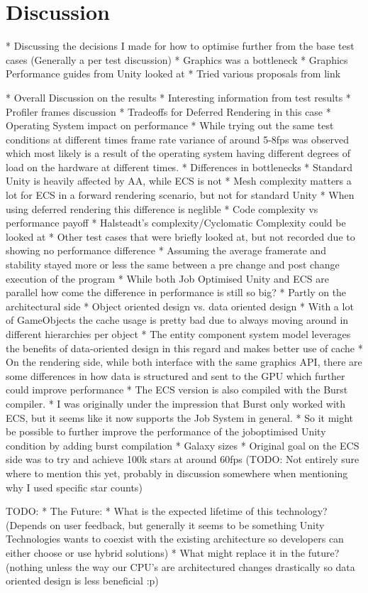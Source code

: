 \section{Discussion}
   * Discussing the decisions I made for how to optimise further from the base test cases (Generally a per test discussion)
      * Graphics was a bottleneck
            * Graphics Performance guides from Unity looked at
                  * Tried various proposals from link

   * Overall Discussion on the results
   * Interesting information from test results 
      * Profiler frames discussion 
      * Tradeoffs for Deferred Rendering in this case
      * Operating System impact on performance
         * While trying out the same test conditions at different times frame rate variance of around 5-8fps was observed which most likely is a result of the operating system having different degrees of load on the hardware at different times.
      * Differences in bottlenecks
         * Standard Unity is heavily affected by AA, while ECS is not
         * Mesh complexity matters a lot for ECS in a forward rendering scenario, but not for standard Unity
            * When using deferred rendering this difference is neglible
   * Code complexity vs performance payoff
       * Halsteadt's complexity/Cyclomatic Complexity could be looked at
   * Other test cases that were briefly looked at, but not recorded due to showing no performance difference
      * Assuming the average framerate and stability stayed more or less the same between a pre change and post change execution of the program
   * While both Job Optimised Unity and ECS are parallel how come the difference in performance is still so big?
      * Partly on the architectural side
         * Object oriented design vs. data oriented design
         * With a lot of GameObjects the cache usage is pretty bad due to always moving around in different hierarchies per object
         * The entity component system model leverages the benefits of data-oriented design in this regard and makes better use of cache
         * On the rendering side, while both interface with the same graphics  API, there are some differences in how data is structured and sent to the GPU which further could improve performance
      * The ECS version is also compiled with the Burst compiler.
         * I was originally under the impression that Burst only worked with ECS, but it seems like it now supports the Job System in general. 
         * So it might be possible to further improve the performance of the joboptimised Unity condition by adding burst compilation
   * Galaxy sizes
      * Original goal on the ECS side was to try and achieve 100k stars at around 60fps (TODO: Not entirely sure where to mention this yet, probably in discussion somewhere when mentioning why I used specific star counts)

TODO: 
* The Future:
  * What is the expected lifetime of this technology? (Depends on user feedback, but generally it seems to be something Unity Technologies wants to coexist with the existing architecture so developers can either choose or use hybrid solutions)
  * What might replace it in the future? (nothing unless the way our CPU's are architectured changes drastically so data oriented design is less beneficial :p)
